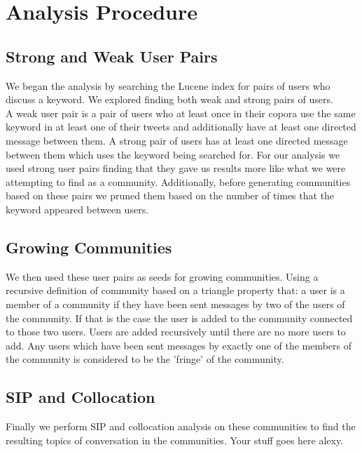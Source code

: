 \section{Analysis Procedure}
\subsection{Strong and Weak User Pairs}
We began the analysis by searching the Lucene index for pairs of users who discuss a keyword.  We explored finding both weak and strong pairs of users.\\
A weak user pair is a pair of users who at least once in their copora use the same keyword in at least one of their tweets and additionally have at least one directed message between them.  A strong pair of users has at least one directed message between them which uses the keyword being searched for.  For our analysis we used strong user pairs finding that they gave us results more like what we were attempting to find as a community.  Additionally, before generating communities based on these pairs we pruned them based on the number of times that the keyword appeared between users.\\
\subsection{Growing Communities}
We then used these user pairs as seeds for growing communities.  Using a recursive definition of community based on a triangle property that: a user is a member of a community if they have been sent messages by two of the users of the community.  If that is the case the user is added to the community connected to those two users. Users are added recursively until there are no more users to add.  Any users which have been sent messages by exactly one of the members of the community is considered to be the 'fringe' of the community.\\
\subsection{SIP and Collocation}
Finally we perform SIP and collocation analysis on these communities to find the resulting topics of conversation in the communities.  Your stuff goes here alexy.\\